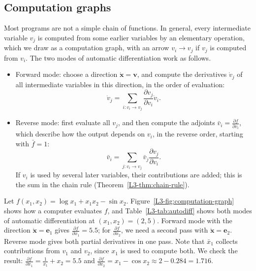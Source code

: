 \subsection{Computation graphs}

Most programs are not a simple chain of functions. In general, every intermediate variable $v_j$ is computed from some earlier variables by an elementary operation, which we draw as a computation graph, with an arrow $v_i \to v_j$ if $v_j$ is computed from $v_i$. The two modes of automatic differentiation work as follows.
\begin{itemize}
    \item Forward mode: choose a direction $\dot{\mathbf{x}} = \mathbf{v}$, and compute the derivatives $\dot v_j$ of all intermediate variables in this direction, in the order of evaluation:
    \[\dot v_j = \sum_{i : v_i \to v_j} \frac{\partial v_j}{\partial v_i} \dot v_i.\]
    \item Reverse mode: first evaluate all $v_j$, and then compute the adjoints $\bar v_i = \frac{\partial f}{\partial v_i}$, which describe how the output depends on $v_i$, in the reverse order, starting with $\bar f = 1$:
    \[\bar v_i = \sum_{j : v_i \to v_j} \bar v_j \frac{\partial v_j}{\partial v_i}.\]
    If $v_i$ is used by several later variables, their contributions are added; this is the sum in the chain rule (Theorem~\ref{L3-thm:chain-rule}).
\end{itemize}

\begin{example}\label{L3-ex:autodiff}
    Let $f(x_1, x_2) = \log x_1 + x_1 x_2 - \sin x_2$. Figure~\ref{L3-fig:computation-graph} shows how a computer evaluates $f$, and Table~\ref{L3-tab:autodiff} shows both modes of automatic differentiation at $(x_1, x_2) = (2, 5)$. Forward mode with the direction $\dot{\mathbf{x}} = \mathbf{e}_1$ gives $\frac{\partial f}{\partial x_1} = 5.5$; for $\frac{\partial f}{\partial x_2}$, we need a second pass with $\dot{\mathbf{x}} = \mathbf{e}_2$. Reverse mode gives both partial derivatives in one pass. Note that $\bar x_1$ collects contributions from $v_1$ and $v_2$, since $x_1$ is used to compute both. We check the result: $\frac{\partial f}{\partial x_1} = \frac{1}{x_1} + x_2 = 5.5$ and $\frac{\partial f}{\partial x_2} = x_1 - \cos x_2 \approx 2 - 0.284 = 1.716$.
\end{example}

